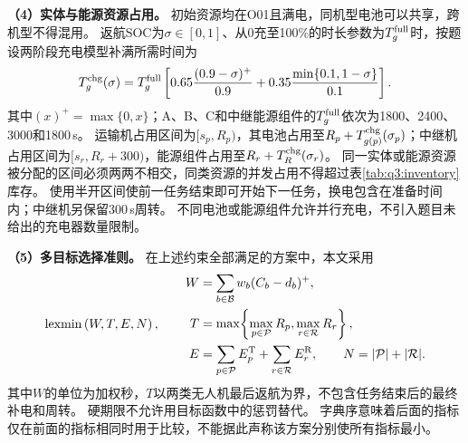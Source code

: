 \textbf{（4）实体与能源资源占用。}
初始资源均在O01且满电，同机型电池可以共享，跨机型不得混用。
返航SOC为$\sigma\in[0,1]$、从0充至100\%的时长参数为$T_g^{\rm full}$时，按题设两阶段充电模型补满所需时间为
\begin{equation}
  T_g^{\rm chg}(\sigma)=T_g^{\rm full}
  \left[0.65\frac{(0.9-\sigma)^+}{0.9}
       +0.35\frac{\min\{0.1,1-\sigma\}}{0.1}\right].
  \label{eq:q3:charging}
\end{equation}
其中$(x)^+=\max\{0,x\}$；A、B、C和中继能源组件的$T_g^{\rm full}$依次为1800、2400、3000和1800\,s。
运输机占用区间为$[s_p,R_p)$，其电池占用至$R_p+T_{g(p)}^{\rm chg}(\sigma_p)$；中继机占用区间为$[s_r,R_r+300)$，能源组件占用至$R_r+T_R^{\rm chg}(\sigma_r)$。
同一实体或能源资源被分配的区间必须两两不相交，同类资源的并发占用不得超过表\ref{tab:q3:inventory}库存。
使用半开区间使前一任务结束即可开始下一任务，换电包含在准备时间内；中继机另保留300\,s周转。
不同电池或能源组件允许并行充电，不引入题目未给出的充电器数量限制。

\textbf{（5）多目标选择准则。}
在上述约束全部满足的方案中，本文采用
\begin{equation}
  \operatorname{lexmin}\left(W,T,E,N\right),\qquad
  \begin{aligned}
    W&=\sum_{b\in\mathcal B}w_b(C_b-d_b)^+,\\
    T&=\max\!\left\{\max_{p\in\mathcal P}R_p,\max_{r\in\mathcal R}R_r\right\},\\
    E&=\sum_{p\in\mathcal P}E_p^{\rm T}+\sum_{r\in\mathcal R}E_r^{\rm R},\qquad
    N=|\mathcal P|+|\mathcal R|.
  \end{aligned}
  \label{eq:q3:objective}
\end{equation}
其中$W$的单位为加权秒，$T$以两类无人机最后返航为界，不包含任务结束后的最终补电和周转。
硬期限不允许用目标函数中的惩罚替代。
字典序意味着后面的指标仅在前面的指标相同时用于比较，不能据此声称该方案分别使所有指标最小。
